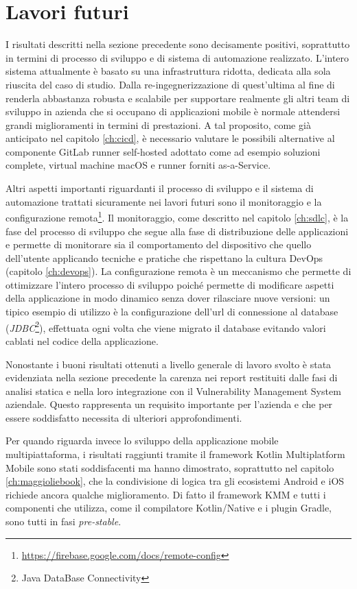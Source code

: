 \section{Lavori futuri}
I risultati descritti nella sezione precedente sono decisamente positivi, soprattutto in termini di processo di sviluppo e di sistema di automazione realizzato. L'intero sistema attualmente è basato su una infrastruttura ridotta, dedicata alla sola riuscita del caso di studio. Dalla re-ingegnerizzazione di quest'ultima al fine di renderla abbastanza robusta e scalabile per supportare realmente gli altri team di sviluppo in azienda che si occupano di applicazioni mobile è normale attendersi grandi miglioramenti in termini di prestazioni. A tal proposito, come già anticipato nel capitolo \ref{ch:cicd}, è necessario valutare le possibili alternative al componente GitLab runner self-hosted adottato come ad esempio soluzioni complete, virtual machine macOS e runner forniti as-a-Service.

Altri aspetti importanti riguardanti il processo di sviluppo e il sistema di automazione trattati sicuramente nei lavori futuri sono il monitoraggio e la configurazione remota\footnote{\href{https://firebase.google.com/docs/remote-config}{https://firebase.google.com/docs/remote-config}}. Il monitoraggio, come descritto nel capitolo \ref{ch:sdlc}, è la fase del processo di sviluppo che segue alla fase di distribuzione delle applicazioni e permette di monitorare sia il comportamento del dispositivo che quello dell'utente applicando tecniche e pratiche che rispettano la cultura DevOps (capitolo \ref{ch:devops}). La configurazione remota è un meccanismo che permette di ottimizzare l'intero processo di sviluppo poiché permette di modificare aspetti della applicazione in modo dinamico senza dover rilasciare nuove versioni: un tipico esempio di utilizzo è la configurazione dell'url di connessione al database (\textit{JDBC}\footnote{Java DataBase Connectivity}), effettuata ogni volta che viene migrato il database evitando valori cablati nel codice della applicazione.

Nonostante i buoni risultati ottenuti a livello generale di lavoro svolto è stata evidenziata nella sezione precedente la carenza nei report restituiti dalle fasi di analisi statica e nella loro integrazione con il Vulnerability Management System aziendale. Questo rappresenta un requisito importante per l'azienda e che per essere soddisfatto necessita di ulteriori approfondimenti.

Per quando riguarda invece lo sviluppo della applicazione mobile multipiattaforma, i risultati raggiunti tramite il framework Kotlin Multiplatform Mobile sono stati soddisfacenti ma hanno dimostrato, soprattutto nel capitolo \ref{ch:maggioliebook}, che la condivisione di logica tra gli ecosistemi Android e iOS richiede ancora qualche miglioramento. Di fatto il framework KMM e tutti i componenti che utilizza, come il compilatore Kotlin/Native e i plugin Gradle, sono tutti in fasi \textit{pre-stable}.

